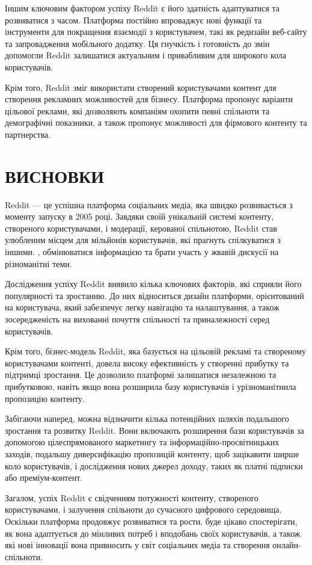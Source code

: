 \documentclass[oneside,14pt]{extarticle}
\begin{document}
Іншим ключовим фактором успіху Reddit є його здатність адаптуватися та розвиватися з часом. Платформа постійно впроваджує нові функції та інструменти для покращення взаємодії з користувачем, такі як редизайн веб-сайту та запровадження мобільного додатку. Ця гнучкість і готовність до змін допомогли Reddit залишатися актуальним і привабливим для широкого кола користувачів.

Крім того, Reddit зміг використати створений користувачами контент для створення рекламних можливостей для бізнесу. Платформа пропонує варіанти цільової реклами, які дозволяють компаніям охопити певні спільноти та демографічні показники, а також пропонує можливості для фірмового контенту та партнерства.

\section*{ВИСНОВКИ}

Reddit — це успішна платформа соціальних медіа, яка швидко розвивається з моменту запуску в 2005 році. Завдяки своїй унікальній системі контенту, створеного користувачами, і модерації, керованої спільнотою, Reddit став улюбленим місцем для мільйонів користувачів, які прагнуть спілкуватися з іншими. , обмінюватися інформацією та брати участь у жвавій дискусії на різноманітні теми.

Дослідження успіху Reddit виявило кілька ключових факторів, які сприяли його популярності та зростанню. До них відноситься дизайн платформи, орієнтований на користувача, який забезпечує легку навігацію та налаштування, а також зосередженість на вихованні почуття спільності та приналежності серед користувачів.

Крім того, бізнес-модель Reddit, яка базується на цільовій рекламі та створеному користувачами контенті, довела високу ефективність у створенні прибутку та підтримці зростання. Це дозволило платформі залишатися незалежною та прибутковою, навіть якщо вона розширила базу користувачів і урізноманітнила пропозицію контенту.

Забігаючи наперед, можна відзначити кілька потенційних шляхів подальшого зростання та розвитку Reddit. Вони включають розширення бази користувачів за допомогою цілеспрямованого маркетингу та інформаційно-просвітницьких заходів, подальшу диверсифікацію пропозицій контенту, щоб зацікавити ширше коло користувачів, і дослідження нових джерел доходу, таких як платні підписки або преміум-контент.

Загалом, успіх Reddit є свідченням потужності контенту, створеного користувачами, і залучення спільноти до сучасного цифрового середовища. Оскільки платформа продовжує розвиватися та рости, буде цікаво спостерігати, як вона адаптується до мінливих потреб і вподобань своїх користувачів, а також які нові інновації вона привносить у світ соціальних медіа та створення онлайн-спільноти.
\end{document}

